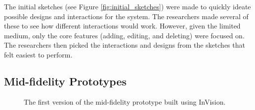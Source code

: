
			The initial sketches (see Figure \ref{fig:initial_sketches}) were made to quickly ideate possible designs and interactions for the system. The researchers made several of these to see how different interactions would work. However, given the limited medium, only the core features (adding, editing, and deleting) were focused on. The researchers then picked the interactions and designs from the sketches that felt easiest to perform.

		\subsection{Mid-fidelity Prototypes}
		\label{sec:mid-fidelity-prototypes}

			\begin{figure}[H]
				\centering
			    \caption{The first version of the mid-fidelity prototype built using InVision.}
			    \label{fig:invision_v1}
			\end{figure} 

